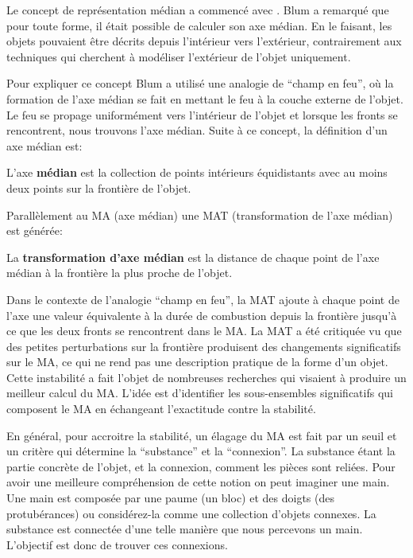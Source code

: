 Le concept de représentation médian a commencé avec \cite{blum1967transformation}.
Blum a remarqué que pour toute forme, il était possible de calculer son axe médian. 
En le faisant, les objets pouvaient être décrits depuis l'intérieur vers l'extérieur, contrairement 
aux techniques qui cherchent à modéliser l'extérieur de l'objet uniquement.

Pour expliquer ce concept Blum a utilisé une analogie de ``champ en feu'', où la formation de l'axe médian se fait en mettant le feu à
la couche externe de l'objet. Le feu se propage uniformément vers l'intérieur de l'objet et
lorsque les fronts se rencontrent, nous trouvons l'axe médian.%
Suite à ce concept, la définition d'un axe médian est:

\begin{definition}
L'axe \textbf{médian} est la collection de points intérieurs équidistants avec au moins deux points sur la frontière de l'objet.
\label{def:medialAxis}
\end{definition}

Parallèlement au MA (axe médian) une MAT (transformation de l'axe médian) est générée:

\begin{definition}
La \textbf{transformation d'axe médian} est la distance de chaque point de l'axe médian à la frontière la plus proche de l'objet.
\end{definition}

Dans le contexte de l'analogie ``champ en feu'', la MAT ajoute à chaque point de l'axe une valeur équivalente à la durée de combustion depuis la frontière
jusqu'à ce que les deux fronts se rencontrent dans le MA.
La MAT a été critiquée vu que des petites perturbations sur la frontière produisent des changements significatifs
sur le MA, ce qui ne rend pas une description pratique de la forme d'un objet.
Cette instabilité a fait l'objet de nombreuses recherches qui visaient à produire un meilleur calcul du MA.
L'idée est d'identifier les sous-ensembles
significatifs qui composent le MA en échangeant l'exactitude contre la stabilité.

En général, pour accroitre la stabilité, un élagage du MA est fait par un seuil et un critère qui détermine
la ``substance'' et la ``connexion''. La substance étant la partie concrète de l'objet, et la connexion, comment les pièces sont reliées.
Pour avoir une meilleure compréhension de cette notion on peut imaginer une main.
Une main est composée par une paume (un bloc) et des doigts (des protubérances) ou
considérez-la comme une collection d'objets connexes. 
La substance est connectée d'une telle manière que nous percevons un main.
L'objectif est donc de trouver ces connexions.

